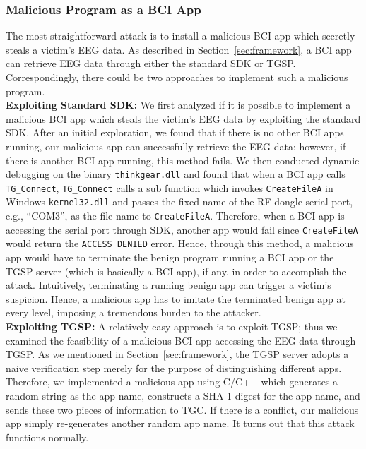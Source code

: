 \subsubsection{Malicious Program as a BCI App}
The most straightforward attack is to install a malicious BCI app which secretly steals a victim's EEG data. As described in Section~\ref{sec:framework}, a BCI app can retrieve EEG data through either the standard SDK or TGSP. Correspondingly, there could be two approaches to implement such a malicious program. \\
\indent \textbf{Exploiting Standard SDK:} We first analyzed  if it is possible to implement a malicious BCI app which steals the victim's EEG data by exploiting the standard SDK. After an initial exploration, we found that if there is no other BCI apps running, our malicious app can successfully retrieve the EEG data; however, if there is another BCI app running, this method fails. We then  conducted dynamic debugging on the binary \texttt{thinkgear.dll} and found that when a BCI app calls \texttt{TG\_Connect}, \texttt{TG\_Connect} calls a sub function which invokes \texttt{CreateFileA} in Windows \texttt{kernel32.dll} and passes the fixed name of the RF dongle serial port, e.g., ``COM3'', as the file name to \texttt{CreateFileA}. Therefore, when a BCI app is accessing the serial port through SDK, another app would fail since \texttt{CreateFileA} would return the \texttt{ACCESS\_DENIED} error. Hence, through this method, a malicious app would have to terminate the benign program running a BCI app or the TGSP server (which is basically a BCI app), if any, in order to accomplish the attack. Intuitively, terminating a running benign app can trigger a victim's suspicion. Hence, a malicious app has to imitate the terminated benign app at every level, imposing a tremendous burden to the attacker. \\
\indent \textbf{Exploiting TGSP:} A relatively easy approach is to exploit TGSP; thus we examined the feasibility of a malicious BCI app accessing the EEG data through TGSP. As we mentioned in Section~\ref{sec:framework}, the TGSP server adopts a naive verification step merely for the purpose of distinguishing different apps. Therefore, we implemented a malicious app using C/C++ which generates a random string as the app name, constructs a SHA-1 digest for the app name, and sends these two pieces of information to TGC. If there is a conflict, our malicious app simply re-generates another random app name. It turns out that this attack functions normally.

